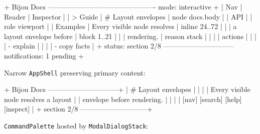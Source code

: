 \begin{CodeBlock}
+ Bijou Docs ---------------------------------------------- mode: interactive +
| Nav                     | Reader                         | Inspector        |
| > Guide                 | # Layout envelopes             | node docs.body   |
|   API                   |                                | role viewport    |
|   Examples              | Every visible node resolves    | inline 24..72    |
|                         | a layout envelope before       | block 1..21      |
|                         | rendering.                     | reason stack     |
|                         |                                | actions          |
|                         |                                | - explain        |
|                         |                                | - copy facts     |
+ status: section 2/8 ------------------------------ notifications: 1 pending +
\end{CodeBlock}

Narrow \texttt{A\allowbreak{}p\allowbreak{}p\allowbreak{}S\allowbreak{}h\allowbreak{}e\allowbreak{}l\allowbreak{}l} preserving primary content:

\begin{CodeBlock}
+ Bijou Docs ------------------------------+
| # Layout envelopes                       |
|                                          |
| Every visible node resolves a layout     |
| envelope before rendering.               |
|                                          |
| [nav] [search] [help] [inspect]          |
+ section 2/8 -----------------------------+
\end{CodeBlock}

\texttt{C\allowbreak{}o\allowbreak{}m\allowbreak{}m\allowbreak{}a\allowbreak{}n\allowbreak{}d\allowbreak{}P\allowbreak{}a\allowbreak{}l\allowbreak{}e\allowbreak{}t\allowbreak{}t\allowbreak{}e} hosted by \texttt{M\allowbreak{}o\allowbreak{}d\allowbreak{}a\allowbreak{}l\allowbreak{}D\allowbreak{}i\allowbreak{}a\allowbreak{}l\allowbreak{}o\allowbreak{}g\allowbreak{}S\allowbreak{}t\allowbreak{}a\allowbreak{}c\allowbreak{}k}:

